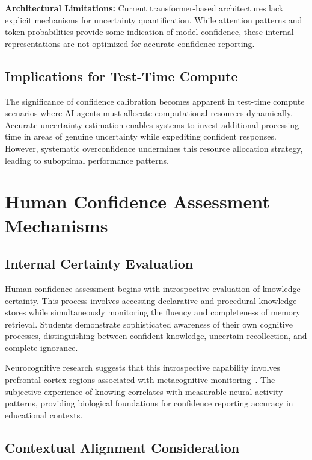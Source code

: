 \documentclass[sigconf]{acmart}
\begin{document}
\textbf{Architectural Limitations:} Current transformer-based architectures lack explicit mechanisms for uncertainty quantification. While attention patterns and token probabilities provide some indication of model confidence, these internal representations are not optimized for accurate confidence reporting.

\subsection{Implications for Test-Time Compute}

The significance of confidence calibration becomes apparent in test-time compute scenarios where AI agents must allocate computational resources dynamically. Accurate uncertainty estimation enables systems to invest additional processing time in areas of genuine uncertainty while expediting confident responses. However, systematic overconfidence undermines this resource allocation strategy, leading to suboptimal performance patterns.

\section{Human Confidence Assessment Mechanisms}

\subsection{Internal Certainty Evaluation}

Human confidence assessment begins with introspective evaluation of knowledge certainty. This process involves accessing declarative and procedural knowledge stores while simultaneously monitoring the fluency and completeness of memory retrieval. Students demonstrate sophisticated awareness of their own cognitive processes, distinguishing between confident knowledge, uncertain recollection, and complete ignorance.

Neurocognitive research suggests that this introspective capability involves prefrontal cortex regions associated with metacognitive monitoring~\cite{fleming2010knowing}. The subjective experience of knowing correlates with measurable neural activity patterns, providing biological foundations for confidence reporting accuracy in educational contexts.

\subsection{Contextual Alignment Consideration}
\end{document}
